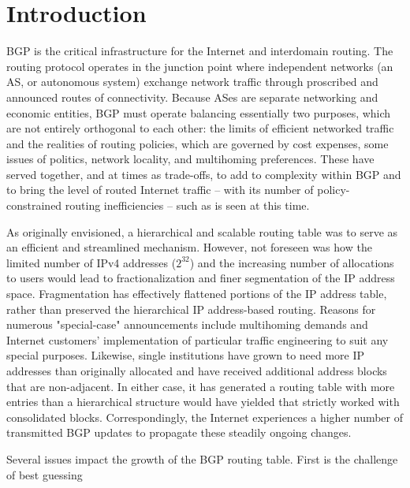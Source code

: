 \section{Introduction}

BGP is the critical infrastructure for the Internet and interdomain routing.  The routing protocol operates in the junction point where independent networks (an AS, or autonomous system) exchange network traffic through proscribed and announced routes of connectivity.  Because ASes are separate networking and economic entities, BGP must operate balancing essentially two purposes, which are not entirely orthogonal to each other: the limits of efficient networked traffic and the realities of routing policies, which are governed by cost expenses, some issues of politics, network locality, and multihoming preferences.  These have served together, and at times as trade-offs, to add to complexity within BGP and to bring the level of routed Internet traffic -- with its number of policy-constrained routing inefficiencies -- such as is seen at this time.

As originally envisioned, a hierarchical and scalable routing table was to serve as an efficient and streamlined mechanism.  However, not foreseen was how the limited number of IPv4 addresses ($2^{32}$) and the increasing number of allocations to users would lead to fractionalization and finer segmentation of the IP address space.  Fragmentation has effectively flattened portions of the IP address table, rather than preserved the hierarchical IP address-based routing.  Reasons for numerous "special-case" announcements include multihoming demands and Internet customers' implementation of particular traffic engineering to suit any special purposes.  Likewise, single institutions have grown to need more IP addresses than originally allocated and have received additional address blocks that are non-adjacent.  In either case, it has generated a routing table with more entries than a hierarchical structure would have yielded that strictly worked with consolidated blocks.  Correspondingly, the Internet experiences a higher number of transmitted BGP updates to propagate these steadily ongoing changes.  

Several issues impact the growth of the BGP routing table.  First is the challenge of best guessing



